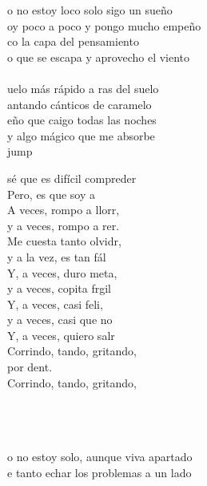 \begin{cancion}%
	o no estoy loco solo sigo un sueño\\
	oy poco a poco y pongo mucho empeño\\
	co la capa del pensamiento\\
	o que se escapa y aprovecho el viento\\
	\jump\\
	uelo más rápido a ras del suelo\\
	antando cánticos de caramelo\\
	eño que caigo todas las noches\\
	y algo mágico que me absorbe\\jump\\
	\begin{chorus}%
	 sé que es difícil compreder\\
	Pero, es que soy a \\
	A veces, rompo a llorr, \\
	y a veces, rompo a rer. \\
	Me cuesta tanto olvidr, \\
	y a la vez, es tan fál\\
	Y, a veces, duro meta, \\
	y a veces, copita frgil \\
	Y, a veces, casi feli, \\
	y a veces, casi que no\\
	Y, a veces, quiero salr\\
	Corrindo, tando, gritando, \\
	por dent.\\
	Corrindo, tando, gritando,\\
	\end{chorus}%
	\jump\\
	\jump\\
	       \\
	o no estoy solo, aunque viva apartado\\
	e tanto echar los problemas a un lado\\

\end{cancion}
